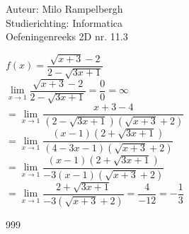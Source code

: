 \documentclass[a4paper]{article}
\newcommand{\fx}{\dfrac{\sqrt{x+3}-2}{2-\sqrt{3x+1}}}
\newcommand{\llim}[1]{ \lim\limits_{x \rightarrow #1} }
\begin{document}
\noindent \large Auteur: Milo Rampelbergh \\
\noindent \large Studierichting: Informatica\\
\noindent \large Oefeningenreeks 2D nr. 11.3\\

\medskip

\normalsize


$ f(x) = \fx $ \\

$ \llim{1} \fx = \dfrac{0}{0} = \infty$ \\

$ = \llim{1} \dfrac{ x+3-4 }{ (2-\sqrt{3x+1})(\sqrt{x+3}+2) } $ \\

$ = \llim{1} \dfrac{ (x-1)(2+\sqrt{3x+1}) }{ (4-3x-1)(\sqrt{x+3}+2) } $ \\

$ = \llim{1} \dfrac{ (x-1)(2+\sqrt{3x+1}) }{ -3(x-1)(\sqrt{x+3}+2) } $ \\

$ = \llim{1} \dfrac{ 2+\sqrt{3x+1} }{ -3(\sqrt{x+3}+2) } = \dfrac{4}{-12} = -\dfrac{1}{3} $ \\


\begin{thebibliography}{999}
\end{thebibliography}
\end{document}
